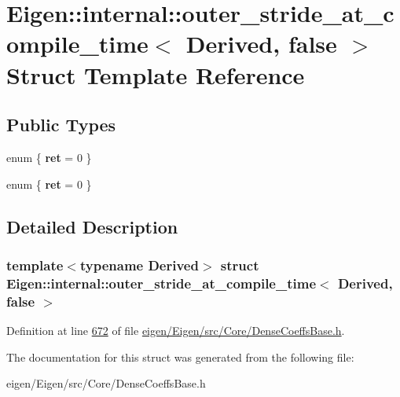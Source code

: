 \hypertarget{struct_eigen_1_1internal_1_1outer__stride__at__compile__time_3_01_derived_00_01false_01_4}{}\section{Eigen\+:\+:internal\+:\+:outer\+\_\+stride\+\_\+at\+\_\+compile\+\_\+time$<$ Derived, false $>$ Struct Template Reference}
\label{struct_eigen_1_1internal_1_1outer__stride__at__compile__time_3_01_derived_00_01false_01_4}
\subsection*{Public Types}
\begin{DoxyCompactItemize}
\item 
\mbox{\label{struct_eigen_1_1internal_1_1outer__stride__at__compile__time_3_01_derived_00_01false_01_4_a5c5f53b8005919f32ca34a89e34b727e}} 
enum \{ {\bfseries ret} = 0
 \}
\item 
\mbox{\label{struct_eigen_1_1internal_1_1outer__stride__at__compile__time_3_01_derived_00_01false_01_4_a639a3a012b52283dff01ac8541cfba4e}} 
enum \{ {\bfseries ret} = 0
 \}
\end{DoxyCompactItemize}


\subsection{Detailed Description}
\subsubsection*{template$<$typename Derived$>$\newline
struct Eigen\+::internal\+::outer\+\_\+stride\+\_\+at\+\_\+compile\+\_\+time$<$ Derived, false $>$}



Definition at line \hyperlink{eigen_2_eigen_2src_2_core_2_dense_coeffs_base_8h_source_l00672}{672} of file \hyperlink{eigen_2_eigen_2src_2_core_2_dense_coeffs_base_8h_source}{eigen/\+Eigen/src/\+Core/\+Dense\+Coeffs\+Base.\+h}.



The documentation for this struct was generated from the following file\+:\begin{DoxyCompactItemize}
\item 
eigen/\+Eigen/src/\+Core/\+Dense\+Coeffs\+Base.\+h\end{DoxyCompactItemize}
